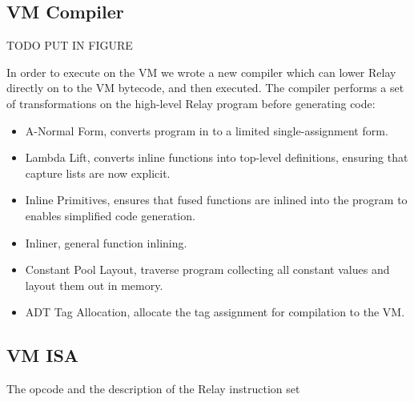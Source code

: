 


\subsection{VM Compiler}

TODO PUT IN FIGURE

In order to execute on the VM we wrote a new compiler which
  can lower Relay directly on to the VM bytecode, and then
  executed.
The compiler performs a set of transformations on the high-level
  Relay program before generating code:
\begin{itemize}
  \item A-Normal Form, converts program in to a limited single-assignment form.
  \item Lambda Lift, converts inline functions into top-level definitions,
        ensuring that capture lists are now explicit.
  \item Inline Primitives, ensures that fused functions are inlined into
        the program to enables simplified code generation.
  \item Inliner, general function inlining.
  \item Constant Pool Layout, traverse program collecting all constant values
        and layout them out in memory.
  \item ADT Tag Allocation, allocate the tag assignment for compilation
        to the VM.
\end{itemize}

\subsection{VM ISA}

\begin{table*}[th]
\centering
\small

\caption{The opcode and the description of the Relay instruction set \label{tab:isa}}
\end{table*}

